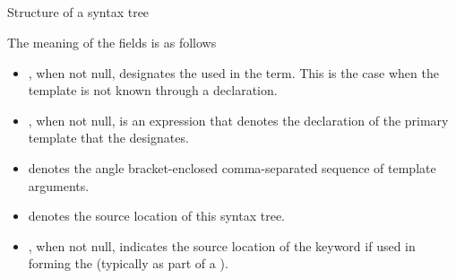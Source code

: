

\subsection{}
\label{sec:ifc:SyntaxSort:TemplateId}

\begin{Structure}
	\caption{Structure of a  syntax tree}
	\label{fig:ifc:SyntaxSort:TemplateId}
\end{Structure}
The meaning of the fields is as follows
\begin{itemize}
	\item {}, when not null, designates the  used in the  term.  This is the case when the template is not known through a declaration.
	\item {}, when not null, is an expression that denotes the declaration of the primary template that the  designates.
	\item {} denotes the angle bracket-enclosed comma-separated sequence of template arguments.
	\item {} denotes the source location of this syntax tree.
	\item {}, when not null, indicates the source location of the  keyword if used in forming the  (typically as part of a ).
\end{itemize}



\subsection{}
\label{sec:ifc:SyntaxSort:MemInitializer}

